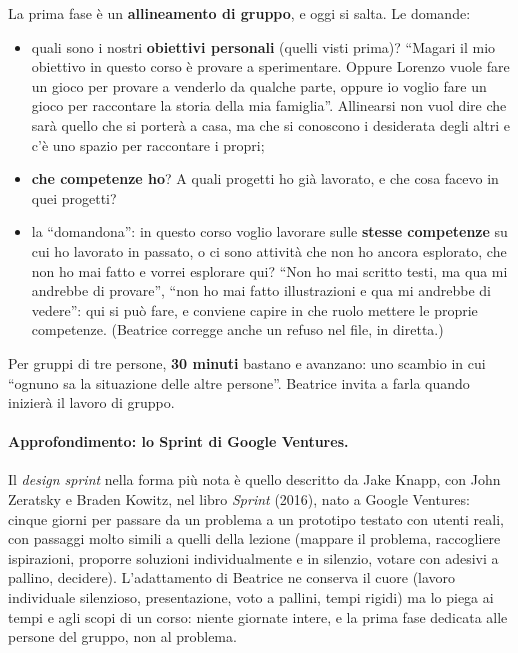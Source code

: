 La prima fase è un \textbf{allineamento di gruppo}, e oggi si salta. Le domande:
\begin{itemize}
  \item quali sono i nostri \textbf{obiettivi personali} (quelli visti prima)?
        ``Magari il mio obiettivo in questo corso è provare a sperimentare. Oppure
        Lorenzo vuole fare un gioco per provare a venderlo da qualche parte, oppure
        io voglio fare un gioco per raccontare la storia della mia famiglia''.
        Allinearsi non vuol dire che sarà quello che si porterà a casa, ma che si
        conoscono i desiderata degli altri e c'è uno spazio per raccontare i propri;
  \item \textbf{che competenze ho}? A quali progetti ho già lavorato, e che cosa
        facevo in quei progetti?
  \item la ``domandona'': in questo corso voglio lavorare sulle \textbf{stesse
        competenze} su cui ho lavorato in passato, o ci sono attività che non ho
        ancora esplorato, che non ho mai fatto e vorrei esplorare qui? ``Non ho mai
        scritto testi, ma qua mi andrebbe di provare'', ``non ho mai fatto
        illustrazioni e qua mi andrebbe di vedere'': qui si può fare, e conviene
        capire in che ruolo mettere le proprie competenze. (Beatrice corregge anche
        un refuso nel file, in diretta.)
\end{itemize}
Per gruppi di tre persone, \textbf{30 minuti} bastano e avanzano: uno scambio in cui
``ognuno sa la situazione delle altre persone''. Beatrice invita a farla quando
inizierà il lavoro di gruppo.

\paragraph{Approfondimento: lo Sprint di Google Ventures.} Il \emph{design sprint}
nella forma più nota è quello descritto da Jake Knapp, con John Zeratsky e Braden
Kowitz, nel libro \emph{Sprint} (2016), nato a Google Ventures: cinque giorni per
passare da un problema a un prototipo testato con utenti reali, con passaggi molto
simili a quelli della lezione (mappare il problema, raccogliere ispirazioni,
proporre soluzioni individualmente e in silenzio, votare con adesivi a pallino,
decidere). L'adattamento di Beatrice ne conserva il cuore (lavoro individuale
silenzioso, presentazione, voto a pallini, tempi rigidi) ma lo piega ai tempi e agli
scopi di un corso: niente giornate intere, e la prima fase dedicata alle persone del
gruppo, non al problema.

